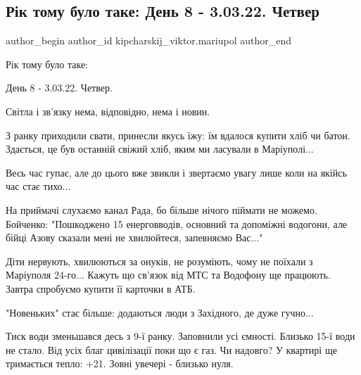  
 
 
 
 

\subsection{Рік тому  було таке:  День 8 - 3.03.22. Четвер}
\label{sec:03_03_2023.fb.kipcharskij_viktor.mariupol.1.r_k_tomu__bulo_take_}

\ifcmt
 author_begin
   author_id kipcharskij_viktor.mariupol
 author_end
\fi

Рік тому  було таке: 

День 8 - 3.03.22. Четвер.

Світла і зв'язку нема, відповідно, нема і новин.

З ранку приходили свати, принесли якусь їжу: їм вдалося купити хліб чи батон. Здається, це був останній свіжий хліб, яким ми ласували в Маріуполі...

Весь час гупає, але до цього вже звикли і звертаємо увагу лише коли на якійсь час стає тихо...

На приймачі слухаємо канал Рада, бо більше нічого піймати не можемо. Бойченко: "Пошкоджено 15 енерговводів, основний та допоміжні водогони, але бійці Азову сказали мені  не хвилюйтеся, запевняємо Вас..."

Діти нервують, хвилюються за онуків, не розуміють, чому не поїхали з Маріуполя 24-го... Кажуть що св'язок від МТС та Водофону ще працюють. Завтра спробуємо купити її карточки в АТБ.

"Новеньких" стає більше: додаються люди з Західного, де дуже гучно...

Тиск води зменьшався десь з 9-ї ранку. Заповнили усі ємності. Близько 15-ї  води не стало. Від усіх благ цивілізації поки що є газ. Чи надовго? У квартирі ще тримається тепло: +21. Зовні увечері - близько нуля.

